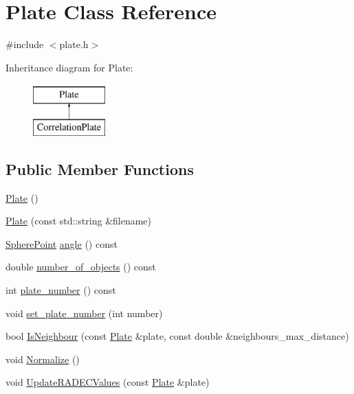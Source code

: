 \hypertarget{class_plate}{\section{Plate Class Reference}
\label{class_plate}
}


{\ttfamily \#include $<$plate.\-h$>$}

Inheritance diagram for Plate\-:\begin{figure}[H]
\begin{center}
\leavevmode
\includegraphics[height=2.000000cm]{class_plate}
\end{center}
\end{figure}
\subsection*{Public Member Functions}
\begin{DoxyCompactItemize}
\item 
\hyperlink{class_plate_aaa77995d1d6acb3f0a9437b8685d5294}{Plate} ()
\item 
\hyperlink{class_plate_a898513f63d991c44add2f1b3e0d771d7}{Plate} (const std\-::string \&filename)
\item 
\hyperlink{class_sphere_point}{Sphere\-Point} \hyperlink{class_plate_a3ca2ca2397d5754d7f599e828d6428ae}{angle} () const 
\item 
double \hyperlink{class_plate_ab350a5bd0d3334e435b2bd52b125cc6e}{number\-\_\-of\-\_\-objects} () const 
\item 
int \hyperlink{class_plate_a74d31939a29286c82ecd8fc7daf075ed}{plate\-\_\-number} () const 
\item 
void \hyperlink{class_plate_a369d3b556e0cb3a7e5bb0cdb9fab6766}{set\-\_\-plate\-\_\-number} (int number)
\item 
bool \hyperlink{class_plate_a1c5e1122f86590fa18551e4874df9603}{Is\-Neighbour} (const \hyperlink{class_plate}{Plate} \&plate, const double \&neighbours\-\_\-max\-\_\-distance)
\item 
void \hyperlink{class_plate_af8c7b2cbadfd5359e7464f6015cbf21c}{Normalize} ()
\item 
void \hyperlink{class_plate_ab7b0d84a37d69bb228331d2f0b482c34}{Update\-R\-A\-D\-E\-C\-Values} (const \hyperlink{class_plate}{Plate} \&plate)
\end{DoxyCompactItemize}
